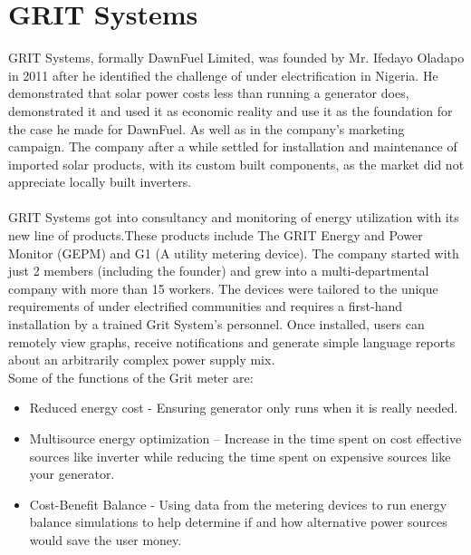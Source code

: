 \section{GRIT Systems}
GRIT Systems, formally DawnFuel Limited, was founded by Mr. Ifedayo
Oladapo in 2011 after he identified the challenge of under electrification in Nigeria. He
demonstrated that solar power costs less than running a generator does, demonstrated
it and used it as economic reality and use it as the foundation for the case he made for
DawnFuel. As well as in the company’s marketing campaign.
The company after a while settled for installation and maintenance of imported solar
products, with its custom built components, as the market did not appreciate locally
built inverters. \\
\\
GRIT Systems got into consultancy and monitoring of energy utilization with its new line of products.These products include The GRIT Energy and Power Monitor (GEPM) and G1 (A utility metering device). The company started with just 2 members (including the founder) and grew into a multi-departmental company with more than 15 workers. The devices were tailored to the unique requirements of under electrified communities and
requires a first-hand installation by a trained Grit System’s personnel. Once installed, users can remotely view graphs, receive notifications and generate simple language reports about an arbitrarily complex power supply mix.\\
Some of the functions of the Grit meter are:
\begin{itemize}
\item Reduced energy cost - Ensuring generator only runs when it is really needed.
\item Multisource energy optimization – Increase in the time spent on cost effective
sources like inverter while reducing the time spent on expensive sources like
your generator.
\item Cost-Benefit Balance - Using data from the metering devices to run energy balance
simulations to help determine if and how alternative power sources would
save the user money. 
\end{itemize}
